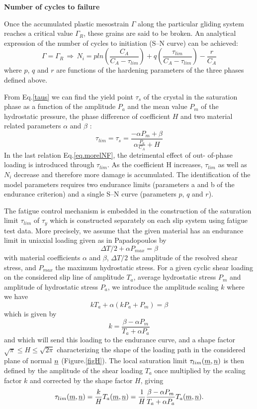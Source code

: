 \vspace{6pt}
\textbf{Number of cycles to failure}
\vspace{6pt}

Once the accumulated plastic mesostrain $\Gamma$ along the particular gliding system reaches a critical value $\Gamma_R$, these grains are said to be broken. An analytical expression of the number
of cycles to initiation (S–N curve) can be achieved:
\begin{equation}
\Gamma=\Gamma_R \, \Rightarrow \, N_i=pln\left(\frac{C_A}{C_A-\tau_{lim}}\right)+q\left(\frac{\tau_{lim}}{C_A-\tau_{lim}}\right)-\frac{r}{C_A}
\label{eq.morelNF}
\end{equation}
where $p$, $q$ and $r$ are functions of the hardening parameters of the three phases defined above.

From Eq.\eqref{taus} we can find the yield point $\tau_s$ of the crystal in the saturation phase as a function of the amplitude $P_a$ and the mean value $P_m$ of the hydrostatic pressure, the phase difference of coefficient $H$ and two material related parameters $\alpha$ and $\beta$ :
\begin{equation}
\tau_{lim}=\tau_s=\frac{-\alpha P_m+\beta}{\alpha\frac{P_a}{C_A}+H}
\label{taus}
\end{equation}
In the last relation Eq.\eqref{eq.morelNF}, the detrimental effect of out-
of-phase loading is introduced through $\tau_{lim}$. As the coefficient H increases, $\tau_{lim}$ as well as $N_i$ decrease and therefore more damage is accumulated. The identification of
the model parameters requires two endurance limits
(parameters a and b of the endurance criterion) and a
single S–N curve (parameters $p$, $q$ and $r$).

The fatigue control mechanism is embedded in the construction of the saturation limit $\tau_{lim}$ of $\tau_y$ which is constructed separately on each slip system using fatigue test data. More precisely, we assume that the given material has an endurance limit in uniaxial loading given as in Papadopoulos by
$$\Delta T/2+\alpha P_{max}=\beta$$
with material coefficients $\alpha$ and $\beta$, $\Delta T/2$ the amplitude of the resolved shear stress, and $P_{max}$ the maximum hydrostatic stress. For a given cyclic shear loading on the considered slip line of amplitude $T_a$, average hydrostatic stress $P_m$ and amplitude of hydrostatic stress $P_a$, we introduce the amplitude scaling $k$ where we have
$$kT_a+\alpha\left( kP_a+P_m\right)=\beta  $$
which is given by
 $$ k=\dfrac{\beta-\alpha P_m}{T_a+\alpha P_a}$$ 
 and which will send this loading to the endurance curve, and a shape factor $\sqrt{\pi}\leqslant H\leqslant \sqrt{2\pi}$ characterizing the shape of the loading path in the considered plane of normal $\uline{n}$ (Figure.\ref{figH}). The local saturation limit $\tau_{lim}(\uline{m},\uline{n})$ is then defined by the amplitude of the shear loading $T_a$ once multiplied by the scaling factor $k$ and corrected by the shape factor $H$, giving
$$\tau_{lim}(\uline{m},\uline{n})=\frac{k}{H}T_a(\uline{m},\uline{n})=\frac{1}{H}\frac{\beta-\alpha P_m}{T_a+\alpha P_a}T_a(\uline{m},\uline{n}).$$

